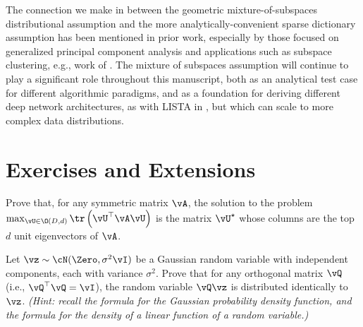 \documentclass[../../book-main.tex]{subfiles}
\begin{document}
The connection we make in  between the
geometric mixture-of-subspaces distributional assumption and the more
analytically-convenient sparse dictionary assumption has been mentioned in prior
work, especially by those focused on generalized principal component analysis
and applications such as subspace clustering, e.g., work of \textcite{GPCA}.
The mixture of subspaces assumption will continue to play a significant role
throughout this manuscript, both as an analytical test case for different
algorithmic paradigms, and as a foundation for deriving different deep network
architectures, as with LISTA in , but which can scale to more
complex data distributions.

\section{Exercises and Extensions}

\begin{exercise}\label{exercise:principal-components-derivation}
    Prove that, for any symmetric matrix \(\vA\), the solution to the problem
    \(\max_{\vU \in \O(D, d)}\tr\left(\vU^{\top}\vA\vU\right)\) is the matrix
    \(\vU^{\star}\) whose columns are the top \(d\) unit eigenvectors
    of \(\vA\).
\end{exercise}

\begin{exercise}\label{exercise:gaussian-rot-invar}
    Let $\vz \sim \cN(\Zero, \sigma^2 \vI)$ be a Gaussian random
    variable with independent components, each with variance $\sigma^2$.
    Prove that for any orthogonal matrix $\vQ$ (i.e., $\vQ^\top \vQ =
    \vI$), the random variable $\vQ \vz$ is distributed identically to $\vz$.
    \textit{(Hint: recall the formula for the Gaussian probability
            density function, and the formula for the density of a linear
    function of a random variable.) }
\end{exercise}
\end{document}
